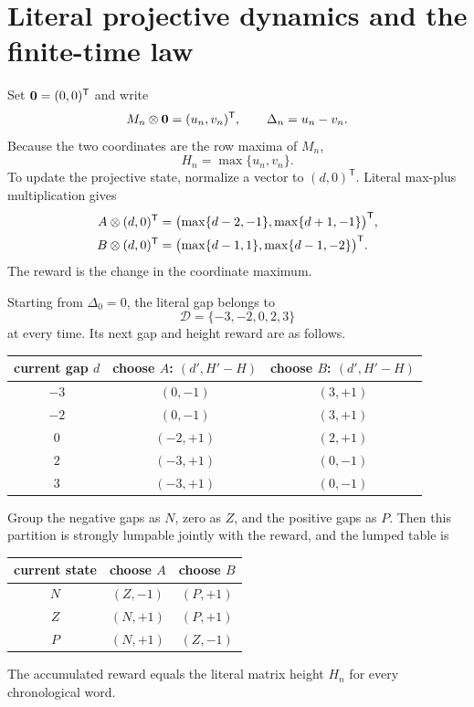 \section{Literal projective dynamics and the finite-time law}
\label{sec:finite-law}

Set $\mathbf{0}=(0,0)^{\mathsf T}$ and write
\[
 M_n\otimes\mathbf{0}=(u_n,v_n)^{\mathsf T},\qquad
 \Delta_n=u_n-v_n.
\]
Because the two coordinates are the row maxima of $M_n$,
\begin{equation}
 \label{eq:height-vector}
 H_n=\max\{u_n,v_n\}.
\end{equation}
To update the projective state, normalize a vector to $(d,0)^{\mathsf T}$.
Literal max-plus multiplication gives
\begin{align}
 A\otimes(d,0)^{\mathsf T}
 &=\bigl(\max\{d-2,-1\},\max\{d+1,-1\}\bigr)^{\mathsf T},
 \label{eq:A-gap-action}\\
 B\otimes(d,0)^{\mathsf T}
 &=\bigl(\max\{d-1,1\},\max\{d-1,-2\}\bigr)^{\mathsf T}.
 \label{eq:B-gap-action}
\end{align}
The reward is the change in the coordinate maximum.

\begin{theorem}
\label{thm:lumping}
Starting from $\Delta_0=0$, the literal gap belongs to
\[
 \mathcal D=\{-3,-2,0,2,3\}
\]
at every time.  Its next gap and height reward are as follows.
\begin{center}
\renewcommand{\arraystretch}{1.12}
\begin{tabular}{c@{\qquad}cc}
\toprule
current gap $d$ & choose $A$: $(d',H'-H)$ & choose $B$: $(d',H'-H)$\\
\midrule
$-3$ & $(0,-1)$ & $(3,+1)$\\
$-2$ & $(0,-1)$ & $(3,+1)$\\
$0$  & $(-2,+1)$ & $(2,+1)$\\
$2$  & $(-3,+1)$ & $(0,-1)$\\
$3$  & $(-3,+1)$ & $(0,-1)$\\
\bottomrule
\end{tabular}
\end{center}
Group the negative gaps as $N$, zero as $Z$, and the positive gaps as $P$.
Then this partition is strongly lumpable jointly with the reward, and the
lumped table is
\begin{center}
\renewcommand{\arraystretch}{1.12}
\begin{tabular}{c@{\qquad}cc}
\toprule
current state & choose $A$ & choose $B$\\
\midrule
$N$ & $(Z,-1)$ & $(P,+1)$\\
$Z$ & $(N,+1)$ & $(P,+1)$\\
$P$ & $(N,+1)$ & $(Z,-1)$\\
\bottomrule
\end{tabular}
\end{center}
The accumulated reward equals the literal matrix height $H_n$ for every
chronological word.
\end{theorem}

